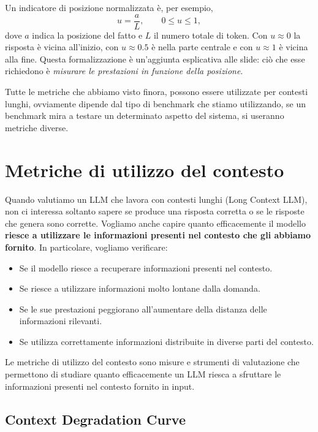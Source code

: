 Un indicatore di posizione normalizzata è, per esempio,
\begin{equation}
u=\frac{a}{L},\qquad 0\leq u\leq1,
\end{equation}
dove $a$ indica la posizione del fatto e $L$ il numero totale di token. Con $u\approx0$ la risposta è vicina all'inizio, con $u\approx0.5$ è nella parte centrale e con $u\approx1$ è vicina alla fine. Questa formalizzazione è un'aggiunta esplicativa alle slide: ciò che esse richiedono è \emph{misurare le prestazioni in funzione della posizione}.

\begin{observation}{}
    Tutte le metriche che abbiamo visto finora, possono essere utilizzate per contesti lunghi, ovviamente dipende dal tipo di benchmark che stiamo utilizzando, se un benchmark mira a testare un determinato aspetto del sistema, si useranno metriche diverse.
\end{observation}

\section{Metriche di utilizzo del contesto}
Quando valutiamo un LLM che lavora con contesti lunghi (Long Context LLM), non ci interessa soltanto sapere se produce una risposta corretta o se le risposte che genera sono corrette.
Vogliamo anche capire quanto efficacemente il modello \textbf{riesce a utilizzare le informazioni presenti nel contesto che gli abbiamo fornito}.
In particolare, vogliamo verificare:
\begin{itemize}
    \item Se il modello riesce a recuperare informazioni presenti nel contesto.
    \item Se riesce a utilizzare informazioni molto lontane dalla domanda.
    \item Se le sue prestazioni peggiorano all'aumentare della distanza delle informazioni rilevanti.
    \item Se utilizza correttamente informazioni distribuite in diverse parti del contesto.
\end{itemize}
\begin{center}
    Le metriche di utilizzo del contesto sono misure e strumenti di valutazione che permettono di studiare quanto efficacemente un LLM riesca a sfruttare le informazioni presenti nel contesto fornito in input.
\end{center}

\subsection{Context Degradation Curve}


